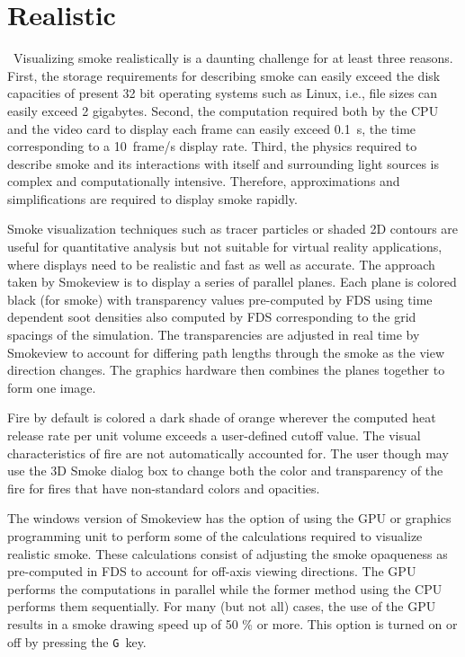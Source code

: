 \documentclass[11pt,twoside]{book}
\begin{document}
\section{Realistic}
\label{section:volsmoke}\ Visualizing smoke realistically is a daunting challenge for at
least three reasons. First, the storage requirements for
describing smoke can easily exceed the disk capacities of present
32 bit operating systems such as Linux, i.e., file sizes can easily
exceed 2 gigabytes. Second, the computation required both by the
CPU and the video card to display each frame can easily exceed
0.1~s, the time corresponding to a 10~frame/s display rate. Third,
the physics required to describe smoke and its interactions with
itself and surrounding light sources is complex and
computationally intensive. Therefore, approximations and
simplifications are required to display smoke rapidly.

Smoke visualization techniques such as tracer particles or shaded
2D contours are useful for quantitative analysis but not suitable
for virtual reality applications, where displays need to be
realistic and fast as well as accurate. The approach taken by
Smokeview is to display a series of parallel planes.  Each plane
is colored black (for smoke) with transparency values pre-computed
by FDS using time dependent soot densities also computed by FDS
corresponding to the grid spacings of the simulation. The
transparencies are adjusted in real time by Smokeview to account
for differing path lengths through the smoke as the view direction
changes. The graphics hardware then combines the planes together
to form one image.

Fire by default is colored a dark shade of orange wherever the
computed heat release rate per unit volume exceeds a user-defined
cutoff value.  The visual characteristics of fire are not
automatically accounted for.  The user though may use the 3D
Smoke dialog box to change both the color and transparency of
the fire for fires that have non-standard colors and opacities.

The windows version of Smokeview has the option of using the GPU
or graphics programming unit to perform some of the calculations
required to visualize realistic smoke.  These calculations consist
of adjusting the smoke opaqueness as pre-computed in FDS to
account for off-axis viewing directions. The GPU performs the
computations in parallel while the former method using the CPU
performs them sequentially.  For many (but not all) cases, the use
of the GPU results in a smoke drawing speed up of 50 \% or more.
This option is turned on or off by pressing the {\tt G}\ key.
\end{document}
